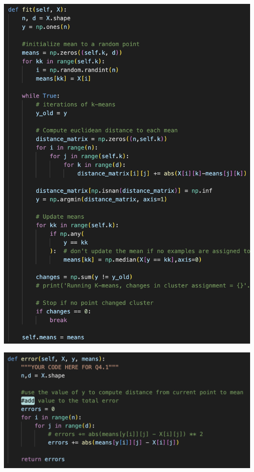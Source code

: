 \documentclass{article}
\begin{document}
{{\begin{center}
     \includegraphics[width=400pt]{figs/4.3.4.png}
 \end{center}
 \begin{center}
     \includegraphics[width=400pt]{figs/4.3.4.2.png}
 \end{center}
  \begin{center}

\end{center}}}
\end{document}
